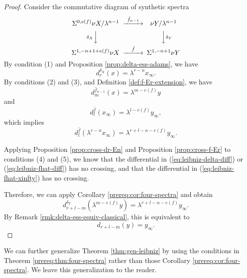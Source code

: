 \begin{proof}
    Consider the commutative diagram of synthetic spectra
    $$\begin{CD}
        \Sus^{0,e(f)}\nu X/\lambda^{n-1} @>{\hat f_{n-1}}>> \nu Y/\lambda^{n-1} \\
        @V{\delta_X}VV @VV{\delta_Y}V \\
        \Sus^{1,-n+1+e(f)} \nu X @>{\hat f}>> \Sus^{1,-n+1}\nu Y
    \end{CD}$$
    By condition (1) and Proposition \ref{prop:delta-ess-adams}, we have
    \begin{equation}\label{eq:leibniz-delta-diff}
        d^{\delta_X}_r(x)=\lambda^{r-n}x_\infty.
    \end{equation}
    By conditions (2) and (3), and Definition \ref{def:f-Er-extension}, we have
    \begin{equation}\label{eq:leibniz-fhat-diff}
        d^{\hat f_{n-1}}_m(x)=\lambda^{m-e(f)} y
    \end{equation}
    and
    \begin{equation*}
        d^{\hat f}_l(x_\infty)=\lambda^{l-e(f)} y_\infty, 
    \end{equation*}
    which implies
    \begin{equation}\label{eq:leibniz-fhat-xinfty}
         d^{\hat f}_l(\lambda^{r-n}x_\infty)=\lambda^{r+l-n-e(f)}y_\infty.
    \end{equation}
    
    Applying Proposition \ref{prop:cross-dr-En} and Proposition \ref{prop:cross-f-Er} to conditions (4) and (5), we know that the differential in (\ref{eq:leibniz-delta-diff}) or (\ref{eq:leibniz-fhat-diff}) has no crossing, and that the differential in (\ref{eq:leibniz-fhat-xinfty}) has no crossing.
    
    Therefore, we can apply Corollary \ref{prereq:cor:four-spectra} and obtain
    $$d^{\delta_Y}_{r+l-m}(\lambda^{m-e(f)} y)=\lambda^{r+l-n-e(f)} y_\infty.$$
    By Remark \ref{rmk:delta-ess-equiv-classical}, this is equivalent to
    $$d_{r+l-m}(y)= y_\infty.$$
\end{proof}

\begin{remark}
    We can further generalize Theorem \ref{thm:gen-leibniz} by using the conditions in Theorem \ref{prereq:thm:four-spectra} rather than those Corollary \ref{prereq:cor:four-spectra}. We leave this generalization to the reader.
\end{remark}

